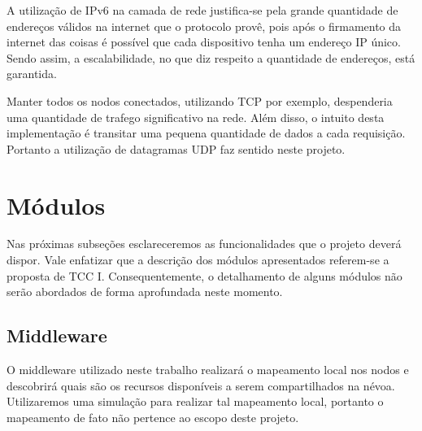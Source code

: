 A utilização de IPv6 na camada de rede justifica-se pela grande quantidade de endereços válidos na internet que o protocolo provê, pois após o firmamento da internet das coisas é possível que cada dispositivo tenha um endereço IP único.
Sendo assim, a escalabilidade, no que diz respeito a quantidade de endereços, está garantida.

Manter todos os nodos conectados, utilizando TCP por exemplo, despenderia uma quantidade de trafego significativo na rede. Além disso, o intuito desta implementação é transitar uma pequena quantidade de dados a cada requisição.
Portanto a utilização de datagramas UDP faz sentido neste projeto.


\section{Módulos}

Nas próximas subseções esclareceremos as funcionalidades que o projeto deverá dispor.
Vale enfatizar que a descrição dos módulos apresentados referem-se a proposta de TCC I.
Consequentemente, o detalhamento de alguns módulos não serão abordados de forma aprofundada neste momento.


\subsection{Middleware}

O middleware utilizado neste trabalho realizará o mapeamento local nos nodos e descobrirá quais são os recursos disponíveis a serem compartilhados na névoa.
Utilizaremos uma simulação para realizar tal mapeamento local, portanto o mapeamento de fato não pertence ao escopo deste projeto.




